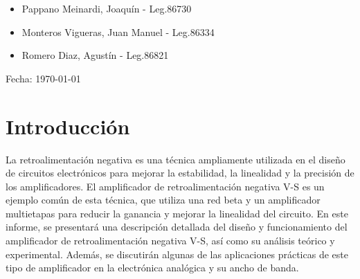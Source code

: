 \documentclass[12pt, letterpaper]{article}
\begin{document}
\begin{titlepage}
            \begin{itemize}
                \item{\Large Pappano Meinardi, Joaquín - Leg.86730\par}
                \item{\Large Monteros Vigueras, Juan Manuel - Leg.86334\par}
                \item{\Large Romero Diaz, Agustín - Leg.86821\par}
            \end{itemize}
        \vspace{0.5cm}
        {\Large Fecha: {\today} \par}%
    \end{titlepage}

\newpage
\tableofcontents
\newpage

\section{Introducción}

La retroalimentación negativa es una técnica ampliamente utilizada en el diseño de circuitos electrónicos para mejorar la estabilidad, la linealidad y la precisión de los amplificadores.
 El amplificador de retroalimentación negativa V-S es un ejemplo común de esta técnica, que utiliza una red beta y un amplificador multietapas para reducir la ganancia y mejorar la linealidad del circuito.
En este informe, se presentará una descripción detallada del diseño y funcionamiento del amplificador de retroalimentación negativa V-S, así como su análisis teórico y experimental.
Además, se discutirán algunas de las aplicaciones prácticas de este tipo de amplificador en la electrónica analógica y su ancho de banda.
\end{document}
